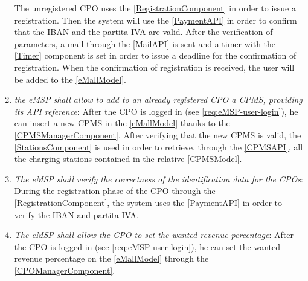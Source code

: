 \begin{enumerate}[label=\textbf{R\arabic*}]
    The unregistered \ac{CPO} uses the \ref{RegistrationComponent} in order to issue a registration. 
    Then the system will use the \ref{PaymentAPI} in order to confirm that the \ac{IBAN} and the \gls{partita IVA} are valid. 
    After the verification of parameters, a mail through the \ref{MailAPI} is sent and a timer with the \ref{Timer} component is set in order to issue a deadline for the confirmation of registration. 
    When the confirmation of registration is received, the user will be added to the \ref{eMallModel}.
    \label{req:eMSP-cpo-registration}
    \item \textit{the \ac{eMSP} shall allow to add to an already registered \ac{CPO} a \ac{CPMS}, providing its \ac{API} reference}:
    After the \ac{CPO} is logged in (see \ref{req:eMSP-user-login}), he can insert a new \ac{CPMS} in the \ref{eMallModel} thanks to the \ref{CPMSManagerComponent}. After verifying that the new \ac{CPMS} is valid, the \ref{StationsComponent} is used in order to retrieve, through the \ref{CPMSAPI}, all the charging stations contained in the relative \ref{CPMSModel}.
    \label{req:eMSP-add-cpms}
    \item \textit{The \ac{eMSP} shall verify the correctness of the identification data for the \acp{CPO}}:
    During the registration phase of the \ac{CPO} through the \ref{RegistrationComponent}, the system uses the \ref{PaymentAPI} in order to verify the \ac{IBAN} and \gls{partita IVA}.
    \label{req:eMSP-correct-cpo-info}
    \item \textit{The \ac{eMSP} shall allow the \ac{CPO} to set the wanted revenue percentage}:
    After the \ac{CPO} is logged in (see \ref{req:eMSP-user-login}), he can set the wanted revenue percentage on the \ref{eMallModel} through the \ref{CPOManagerComponent}.

\end{enumerate}
